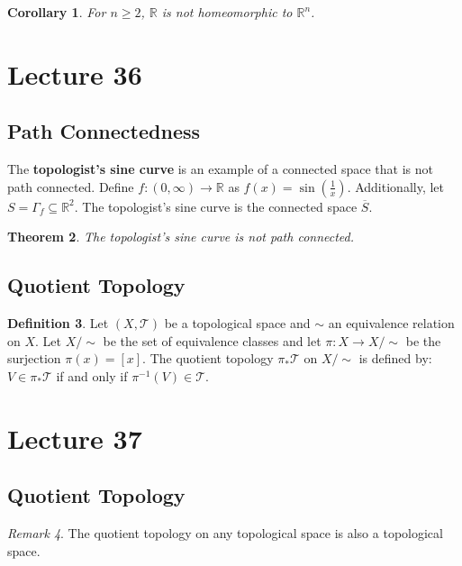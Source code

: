 \documentclass[ 12pt ]{article}
\newcounter{lecture_num}
\theoremstyle{plain}
\theoremstyle{plain}
\newtheorem{theorem}{Theorem}[lecture_num]
\newtheorem{corollary}[theorem]{Corollary}
\theoremstyle{definition}
\newtheorem{definition}[theorem]{Definition}
\theoremstyle{remark}
\newtheorem{remark}[theorem]{Remark}
\begin{document}
\begin{corollary}
	For $n \geq 2$, $\mathbb{R}$ is not homeomorphic to $\mathbb{R}^n$.
\end{corollary}


\setcounter{lecture_num}{36}
\setcounter{theorem}{0}
\section*{Lecture 36}

\subsection*{Path Connectedness}

The \textbf{topologist's sine curve} is an example of a connected space that is not path connected. Define $f : (0, \infty) \to \mathbb{R}$ as $f(x) = \sin \left ( \frac{1}{x} \right )$.
Additionally, let $S = \Gamma_f \subseteq \mathbb{R}^2$. The topologist's sine curve is the connected space $\overline{S}$. 

\begin{theorem}
	The topologist's sine curve is not path connected.
\end{theorem}

\subsection*{Quotient Topology}

\begin{definition}
	Let $(X, \mathcal{T})$ be a topological space and $\sim$ an equivalence relation on $X$. Let $X/\sim$ be the set of equivalence classes and let $\pi : X \to X/\sim$ be the surjection
	$\pi(x) = [x]$. The quotient topology $\pi_* \mathcal{T}$ on $X/\sim$ is defined by: $V \in \pi_* \mathcal{T}$ if and only if $\pi^{-1}(V) \in \mathcal{T}$.
\end{definition}


\setcounter{lecture_num}{37}
\setcounter{theorem}{0}
\section*{Lecture 37}

\subsection*{Quotient Topology}

\begin{remark}
	The quotient topology on any topological space is also a topological space.
\end{remark}
\end{document}

